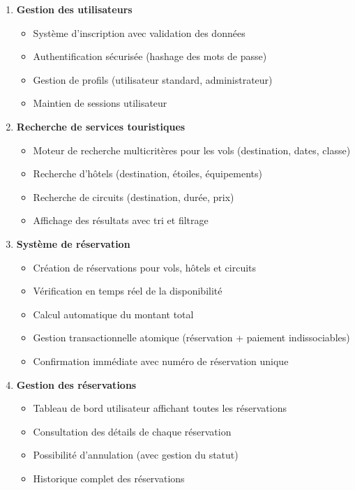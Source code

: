 \documentclass[12pt,a4paper]{report}
\begin{document}
\begin{enumerate}
    \item \textbf{Gestion des utilisateurs}
    \begin{itemize}
        \item Système d'inscription avec validation des données
        \item Authentification sécurisée (hashage des mots de passe)
        \item Gestion de profils (utilisateur standard, administrateur)
        \item Maintien de sessions utilisateur
    \end{itemize}
    
    \item \textbf{Recherche de services touristiques}
    \begin{itemize}
        \item Moteur de recherche multicritères pour les vols (destination, dates, classe)
        \item Recherche d'hôtels (destination, étoiles, équipements)
        \item Recherche de circuits (destination, durée, prix)
        \item Affichage des résultats avec tri et filtrage
    \end{itemize}
    
    \item \textbf{Système de réservation}
    \begin{itemize}
        \item Création de réservations pour vols, hôtels et circuits
        \item Vérification en temps réel de la disponibilité
        \item Calcul automatique du montant total
        \item Gestion transactionnelle atomique (réservation + paiement indissociables)
        \item Confirmation immédiate avec numéro de réservation unique
    \end{itemize}
    
    \item \textbf{Gestion des réservations}
    \begin{itemize}
        \item Tableau de bord utilisateur affichant toutes les réservations
        \item Consultation des détails de chaque réservation
        \item Possibilité d'annulation (avec gestion du statut)
        \item Historique complet des réservations
    \end{itemize}
    

\end{enumerate}
\end{document}
